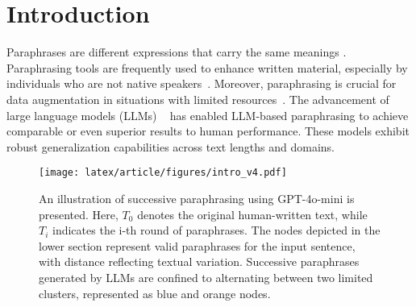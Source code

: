 \section{Introduction}

Paraphrases are different expressions that carry the same meanings \citep{bhagat2013what}.
Paraphrasing tools are frequently used to enhance written material, especially by individuals who are not native speakers~\cite{motlagh_impact_nodate,roe_what_2022,kim_how_2024}.
Moreover, paraphrasing is crucial for data augmentation in situations with limited resources~\cite{okur_data_2022,sobrevilla_cabezudo_investigating_2024}.
The advancement of large language models (LLMs) ~\citep{touvron2023llama2openfoundation,alpaca,gpt3,gpt4} has enabled LLM-based paraphrasing to achieve comparable or even superior results to human performance. 
These models exhibit robust generalization capabilities across text lengths and domains.
\begin{figure}[t!]
    \centering
    \texttt{[image: latex/article/figures/intro\_v4.pdf]}
    \caption{An illustration of successive paraphrasing using GPT-4o-mini is presented. Here, $T_0$ denotes the original human-written text, while $T_i$ indicates the i-th round of paraphrases. The nodes depicted in the lower section represent valid paraphrases for the input sentence, with distance reflecting textual variation. Successive paraphrases generated by LLMs are confined to alternating between two limited clusters, represented as blue and orange nodes.} 
    \label{figs:intro}
\end{figure}


